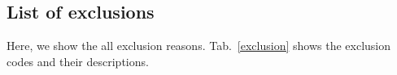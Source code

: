 \documentclass[dvipdfmx, english]{ampmt}             %
\def\numberofspines{1}
\newcommand{\Tabref}[1]{Tab.~\ref{#1}}
\newcommand{\Figref}[1]{Fig.~\ref{#1}}
\begin{document}

\subsection{List of exclusions}\label{sec:exclusions}
Here, we show the all exclusion reasons. \Tabref{exclusion} shows the exclusion codes and their descriptions.


\fi
\ifoutputcover
\evenclearpage
\makecover                      %
\makespine[\numberofspines]     %
\fi
\ifoutputabstractforsubmission
\makeabstractforsubmission      %
\fi
\end{document}
